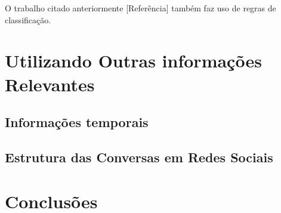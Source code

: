 \quad O trabalho citado anteriormente [Referência] também faz uso de regras de
classificação.  

\section{Utilizando Outras informações Relevantes}

\subsection{Informações temporais}

\subsection{Estrutura das Conversas em Redes Sociais}

\section{Conclusões}
